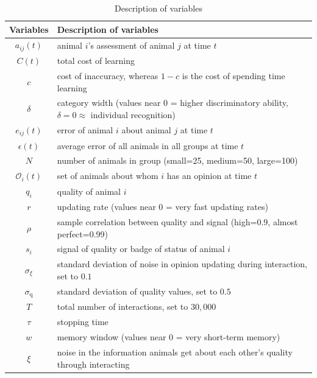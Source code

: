 %
\begin {table}[ht]
\caption {Description of variables} \label{tab:vars} 
\begin{tabular}{cl}

 Variables & Description of variables \\
\midrule 
$a_{ij}(t)$ & animal $i$'s assessment of animal $j$ at time $t$ \\
$C(t)$ & total cost of learning \\ 
$c$ & cost of inaccuracy, whereas $1-c$ is the cost of spending time learning \\ 
$\delta$ & category width (values near 0 = higher discriminatory ability, $\delta=0 \approx$ individual recognition)\\
$e_{ij}(t)$ & error of animal $i$ about animal $j$ at time $t$\\
$\epsilon(t)$ & average error of all animals in all groups at time $t$ \\
$N$ & number of animals in group (small=25, medium=50, large=100)\\ 
$\mathscr{O}_i(t)$ & set of animals about whom $i$ has an opinion at time $t$\\
$q_i$ & quality of animal $i$ \\ 
$r$ & updating rate (values near 0 = very fast updating rates)\\
$\rho$ & sample correlation between quality and signal (high=0.9, almost perfect=0.99)\\
$s_i$ & signal of quality or badge of status of animal $i$ \\ 
$\sigma_\xi$ & standard deviation of noise in opinion updating during interaction, set to $0.1$ \\
$\sigma_\text{q}$ & standard deviation of quality values, set to $0.5$ \\
$T$ & total number of interactions, set to $30,000$ \\
$\tau$ & stopping time \\
$w$ & memory window (values near 0 = very short-term memory)\\
$\xi$ & noise in the information animals get about each other's quality through interacting
\end{tabular}
\end {table}



